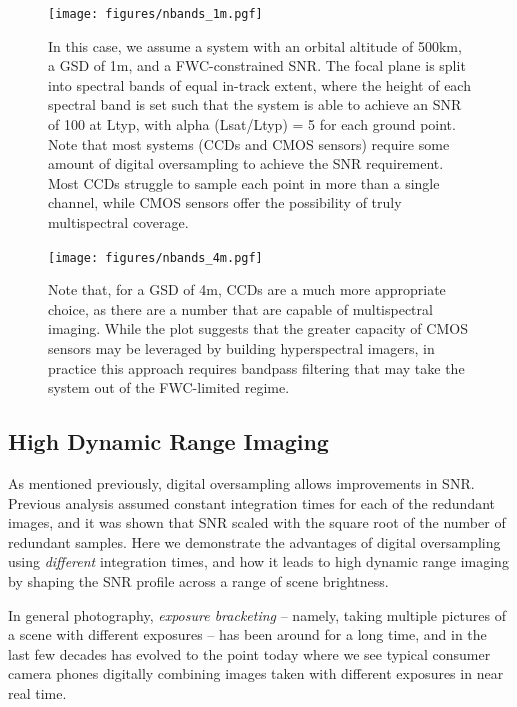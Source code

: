 \documentclass[10pt,journal]{IEEEtran}  %
\begin{document}
\begin{figure}
  \texttt{[image: figures/nbands\_1m.pgf]}
  \caption{In this case, we assume a system with an orbital altitude of 500km, a GSD of 1m, and a FWC-constrained SNR. The focal plane is split into spectral bands of equal in-track extent, where the height of each spectral band is set such that the system is able to achieve an SNR of 100 at Ltyp, with alpha (Lsat/Ltyp) = 5 for each ground point. Note that most systems (CCDs and CMOS sensors) require some amount of digital oversampling to achieve the SNR requirement. Most CCDs struggle to sample each point in more than a single channel, while CMOS sensors offer the possibility of truly multispectral coverage. \label{fig:nbands_1m}}
\end{figure}

\begin{figure}
  \texttt{[image: figures/nbands\_4m.pgf]}
  \caption{Note that, for a GSD of 4m, CCDs are a much more appropriate choice, as there are a number that are capable of multispectral imaging. While the plot suggests that the greater capacity of CMOS sensors may be leveraged by building hyperspectral imagers, in practice this approach requires bandpass filtering that may take the system out of the FWC-limited regime.
  \label{fig:nbands_4m}}
\end{figure}


\subsection{High Dynamic Range Imaging}
\label{sec:hdr}

As mentioned previously, digital oversampling allows improvements in SNR. Previous analysis assumed constant integration times for each of the redundant images, and it was shown that SNR scaled with the square root of the number of redundant samples. Here we demonstrate the advantages of digital oversampling using \emph{different} integration times, and how it leads to high dynamic range imaging by shaping the SNR profile across a range of scene brightness.

In general photography, \emph{exposure bracketing} -- namely, taking multiple pictures of a scene with different exposures -- has been around for a long time, and in the last few decades has evolved to the point today where we see typical consumer camera phones digitally combining images taken with different exposures in near real time.
\end{document}
